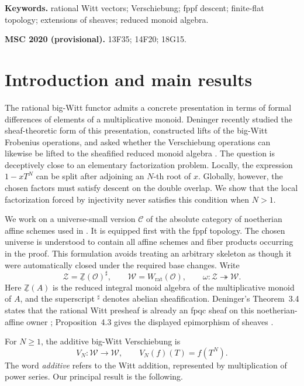 \documentclass[11pt]{article}
\theoremstyle{definition}
\newcommand{\Wrat}{W_{\mathrm{rat}}}
\newcommand{\Zpre}{\underline{\mathbb Z}}
\newcommand{\Zsh}{\mathcal Z}
\newcommand{\Wsh}{\mathcal W}
\newcommand{\sh}{\sharp}
\begin{document}
\noindent\textbf{Keywords.}
rational Witt vectors; Verschiebung; fppf descent; finite-flat topology;
extensions of sheaves; reduced monoid algebra.

\medskip
\noindent\textbf{MSC 2020 (provisional).}
13F35; 14F20; 18G15.

\section{Introduction and main results}

The rational big-Witt functor admits a concrete presentation in terms of
formal differences of elements of a multiplicative monoid.  Deninger
recently studied the sheaf-theoretic form of this presentation, constructed
lifts of the big-Witt Frobenius operations, and asked whether the
Verschiebung operations can likewise be lifted to the sheafified reduced
monoid algebra
\cite[p.~25]{Deninger2025Rational}.  The question is deceptively close to
an elementary factorization problem.  Locally, the expression
\(1-xT^N\) can be split after adjoining an \(N\)-th root of \(x\).
Globally, however, the chosen factors must satisfy descent on the double
overlap.  We show that the local factorization forced by injectivity never
satisfies this condition when \(N>1\).

We work on a universe-small version \(\mathscr C\) of the absolute category
of noetherian affine schemes used in
\cite[Secs.~3--4]{Deninger2025Rational}.  It is equipped first with the
fppf topology.  The chosen universe is understood to contain all affine
schemes and fiber products occurring in the proof.  This formulation avoids
treating an arbitrary skeleton as though it were automatically closed under
the required base changes.  Write
\[
 \Zsh=\Zpre(\mathcal O)^\sh,\qquad
 \Wsh=\Wrat(\mathcal O),\qquad
 \omega\colon\Zsh\twoheadrightarrow\Wsh .
\]
Here \(\Zpre(A)\) is the reduced integral monoid algebra of the
multiplicative monoid of \(A\), and the superscript \({}^\sh\) denotes
abelian sheafification.  Deninger's Theorem~3.4 states that the rational
Witt presheaf is already an fpqc sheaf on this noetherian-affine owner
\cite[Thm.~3.4, p.~19]{Deninger2025Rational}; Proposition~4.3 gives the
displayed epimorphism of sheaves
\cite[Prop.~4.3, p.~21]{Deninger2025Rational}.

For \(N\geq1\), the additive big-Witt Verschiebung is
\[
 V_N\colon\Wsh\longrightarrow\Wsh,\qquad
 V_N(f)(T)=f(T^N).
\]
The word \emph{additive} refers to the Witt addition, represented by
multiplication of power series.  Our principal result is the following.
\end{document}
